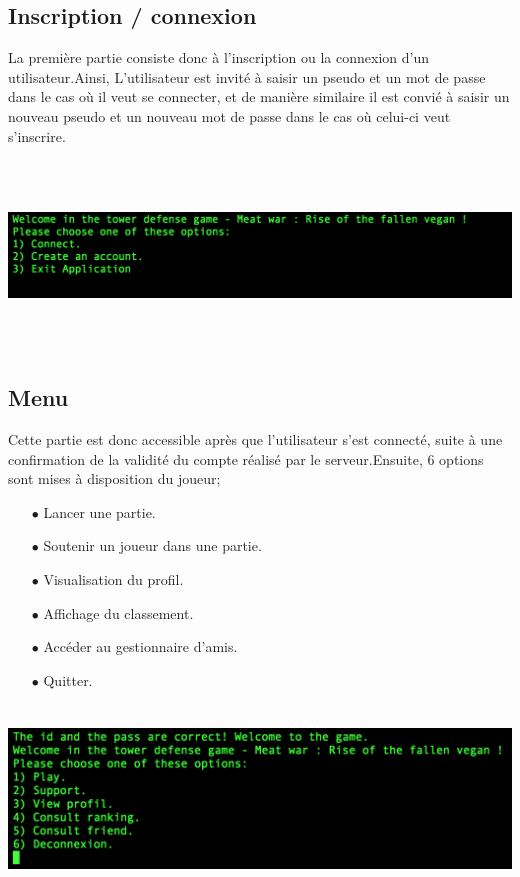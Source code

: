\documentclass[12pt,a4paper]{article}
\begin{document}
\subsection{Inscription / connexion}
La première partie consiste donc à l'inscription ou la connexion d'un  utilisateur.Ainsi, L'utilisateur est invité à saisir un pseudo  et un mot de passe dans le cas où il veut se connecter, et de manière similaire il est convié à saisir un nouveau pseudo et un nouveau mot de passe dans le cas où celui-ci veut s'inscrire.
\begin{center}
    \includegraphics[height=5cm,width=14cm]{login.png}
\end{center}
\newpage
\subsection{Menu}
Cette partie est donc accessible après que l'utilisateur s'est connecté, suite à une confirmation de la validité du compte réalisé par le serveur.Ensuite, 6 options sont mises à disposition du joueur;
\begin{itemize}
\item[$\bullet$] Lancer une partie.
\item[$\bullet$] Soutenir un joueur dans une partie.
\item[$\bullet$] Visualisation du profil.
\item[$\bullet$] Affichage du classement.
\item[$\bullet$] Accéder au gestionnaire d'amis.
\item[$\bullet$] Quitter.
\end{itemize}
\begin{center}
    \includegraphics[height=5cm,width=14cm]{menu.png}
\end{center}
  
\end{document}
